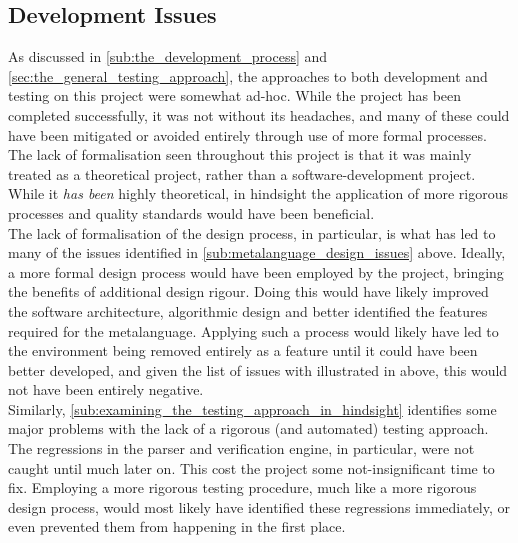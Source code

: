 

\subsection{Development Issues} %
\label{sub:development_issues}
As discussed in \autoref{sub:the_development_process} and \autoref{sec:the_general_testing_approach}, the approaches to both development and testing on this project were somewhat ad-hoc. 
While the project has been completed successfully, it was not without its headaches, and many of these could have been mitigated or avoided entirely through use of more formal processes.
The lack of formalisation seen throughout this project is that it was mainly treated as a theoretical project, rather than a software-development project.
While it \textit{has been} highly theoretical, in hindsight the application of more rigorous processes and quality standards would have been beneficial.\\

The lack of formalisation of the design process, in particular, is what has led to many of the issues identified in \autoref{sub:metalanguage_design_issues} above.
Ideally, a more formal design process would have been employed by the project, bringing the benefits of additional design rigour.
Doing this would have likely improved the software architecture, algorithmic design and better identified the features required for the metalanguage. 
Applying such a process would likely have led to the environment being removed entirely as a feature until it could have been better developed, and given the list of issues with illustrated in  above, this would not have been entirely negative. \\

Similarly, \autoref{sub:examining_the_testing_approach_in_hindsight} identifies some major problems with the lack of a rigorous (and automated) testing approach.
The regressions in the parser and verification engine, in particular, were not caught until much later on.
This cost the project some not-insignificant time to fix. 
Employing a more rigorous testing procedure, much like a more rigorous design process, would most likely have identified these regressions immediately, or even prevented them from happening in the first place.\\

